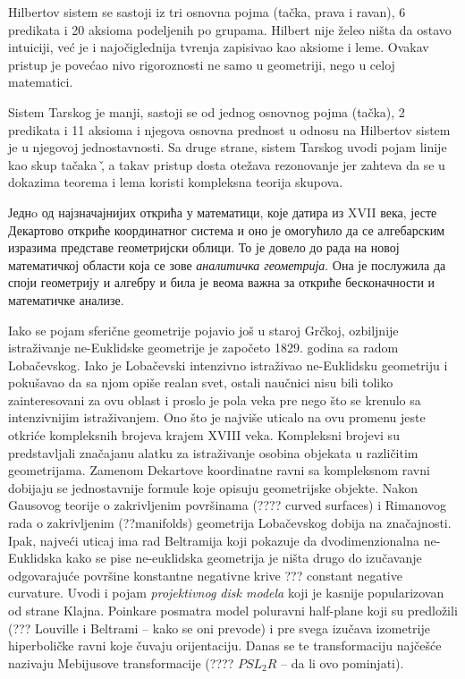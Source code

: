 \documentclass{article}
\begin{document}
Hilbertov sistem se sastoji iz tri osnovna pojma (ta\v cka, prava i
ravan), 6 predikata i 20 aksioma podeljenih po grupama. Hilbert nije
\v zeleo ni\v sta da ostavo intuiciji, ve\' c je i najo\v ciglednija
tvr\dj enja zapisivao kao aksiome i leme. Ovakav pristup je pove\' cao
nivo rigoroznosti ne samo u geometriji, nego u celoj matematici. 

Sistem Tarskog je manji, sastoji se od jednog osnovnog pojma (ta\v
cka), 2 predikata i 11 aksioma i njegova osnovna prednost u odnosu na
Hilbertov sistem je u njegovoj jednostavnosti. Sa druge strane, sistem
Tarskog uvodi pojam linije kao skup ta\v caka \v, a takav pristup
dosta ote\v zava rezonovanje jer zahteva da se u dokazima teorema i
lema koristi kompleksna teorija skupova.

Једнo од најзначајнијих открића у математици, које датира из {\lat
  XVII} века, јесте Декартово откриће координатног система и оно је
омогућило да се алгебарским изразима представе геометријски облици. То
је довело до рада на новој математичкој области која се зове
\emph{аналитичка геометрија}. Она је послужила да споји геометрију и
алгебру и била је веома важна за откриће бесконачности и математичке
анализе.

Iako se pojam sferi\v cne geometrije pojavio jo\v s u staroj Gr\v
ckoj, ozbiljnije istra\v zivanje ne-Euklidske geometrije je zapo\v
ceto 1829. godina sa radom Loba\v cevskog. Iako je Loba\v cevski
intenzivno istra\v zivao ne-Euklidsku geometriju i poku\v savao da sa
njom opi\v se realan svet, ostali nau\v cnici nisu bili toliko
zainteresovani za ovu oblast i proslo je pola veka pre nego \v sto se
krenulo sa intenzivnijim istra\v zivanjem.  Ono \v sto je najvi\v se
uticalo na ovu promenu jeste otkri\'ce kompleksnih brojeva krajem
{\lat XVIII} veka. Kompleksni brojevi su predstavljali zna\v cajanu
alatku za istra\v zivanje osobina objekata u razli\v citim
geometrijama. Zamenom Dekartove koordinatne ravni sa kompleksnom ravni
dobijaju se jednostavnije formule koje opisuju geometrijske
objekte. Nakon Gausovog teorije o zakrivljenim povr\v sinama (???? {\lat
curved surfaces}) i Rimanovog rada o zakrivljenim (??{\lat manifolds})
geometrija Loba\v cevskog dobija na zna\v cajnosti. Ipak, najve\' ci
uticaj ima rad Beltramija koji pokazuje da dvodimenzionalna
ne-Euklidska {\lat kako se pise ne-euklidska} geometrija je ni\v sta
drugo do izu\v cavanje odgovaraju\' ce povr\v sine konstantne
negativne krive ??? {\lat constant negative curvature}. Uvodi i pojam
{\em projektivnog disk modela} koji je kasnije popularizovan od strane
Klajna. Poinkare posmatra model poluravni {\lat half-plane} koji su
predlo\v zili {\lat (??? Louville i Beltrami -- kako se oni prevode)} i pre svega izu\v cava
izometrije hiperboli\v cke ravni koje \v cuvaju orijentaciju. Danas se
te transformaciju naj\v ce\v s\'ce nazivaju Mebijusove transformacije
{\lat (???? $PSL_2R$ -- da li ovo pominjati)}.
\end{document}
